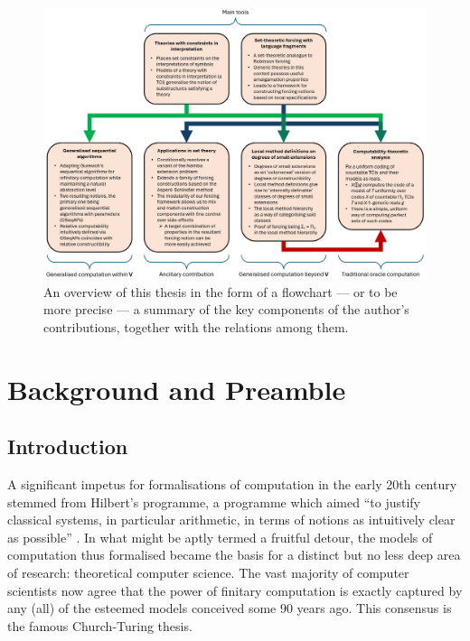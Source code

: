 \documentclass[12pt, twoside]{memoir}
\numberwithin{equation}{section}
\theoremstyle{definition}
\theoremstyle{remark}
\theoremstyle{definition}
\theoremstyle{definition}
\theoremstyle{definition}
\theoremstyle{remark}
\newcommand{\blankpage}{
\newpage
\thispagestyle{empty}
\mbox{}
\newpage
}
\begin{document}
\begin{figure}
    \centering
    \centerline{\includegraphics[width=\textwidth]{Overview_Chart.png}}
    \captionsetup{width=0.9\textwidth, format=hang}
    \caption[Key components of thesis]{An overview of this thesis in the form of a flowchart --- or to be more precise --- a summary of the key components of the author's contributions, together with the relations among them.}
    \label{overview}
\end{figure}

\clearpage

\blankpage

\mainmatter

\part{Background and Preamble}

\chapter{Introduction}\label{sect1}

A significant impetus for formalisations of computation in the early 20th century stemmed from Hilbert's programme, a programme which aimed ``to justify classical systems, in particular arithmetic, in terms of notions as intuitively clear as possible'' \cite{godelcw2}. In what might be aptly termed a fruitful detour, the models of computation thus formalised became the basis for a distinct but no less deep area of research: theoretical computer science. The vast majority of computer scientists now agree that the power of finitary computation is exactly captured by any (all) of the esteemed models conceived some 90 years ago. This consensus is the famous Church-Turing thesis.
\end{document}

